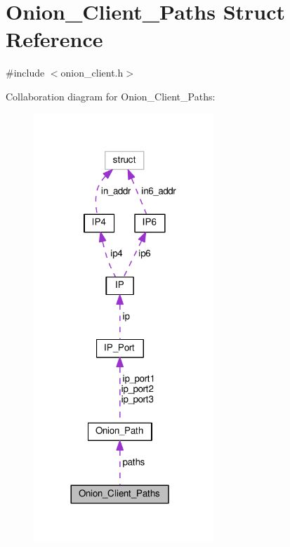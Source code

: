 \hypertarget{struct_onion___client___paths}{\section{Onion\+\_\+\+Client\+\_\+\+Paths Struct Reference}
\label{struct_onion___client___paths}
}


{\ttfamily \#include $<$onion\+\_\+client.\+h$>$}



Collaboration diagram for Onion\+\_\+\+Client\+\_\+\+Paths\+:
\nopagebreak
\begin{figure}[H]
\begin{center}
\leavevmode
\includegraphics[width=192pt]{de/df8/struct_onion___client___paths__coll__graph}
\end{center}
\end{figure}
